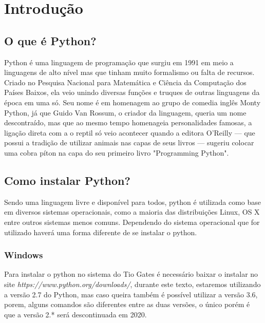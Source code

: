 \section{Introdução}
\subsection{O que é Python?}
Python é uma linguagem de programação que surgiu em 1991 em meio a linguagens de alto nível mas que tinham muito formalismo ou falta de recursos. Criado no Pesquisa Nacional para Matemática e Ciência da Computação dos Países Baixos, ela veio unindo diversas funções e truques de outras linguagens da época em uma só. Seu nome é em homenagem ao grupo de comedia inglês Monty Python, já que Guido Van Rossum, o criador da linguagem, queria um nome descontraído, mas que ao mesmo tempo homenageia personalidades famosas, a ligação direta com a o reptil só veio acontecer quando a editora O’Reilly — que possui a tradição de utilizar animais nas capas de seus livros — sugeriu colocar uma cobra píton na capa do seu primeiro livro "Programming Python".
\subsection{Como instalar Python?}
Sendo uma linguagem livre e disponível para todos, python é utilizada como base em diversos sistemas operacionais, como a maioria das distribuições Linux, OS X entre outros sistemas menos comuns. Dependendo do sistema operacional que for utilizado haverá uma forma diferente de se instalar o python.
\subsubsection{Windows}
Para instalar o python no sistema do Tio Gates é necessário baixar o instalar no site \emph{https://www.python.org/downloads/}, durante este texto, estaremos utilizando a versão 2.7 do Python, mas caso queira também é possível utilizar a versão 3.6, porem, alguns comandos são diferentes entre as duas versões, o único porém é que a versão 2.* será descontinuada em 2020.

